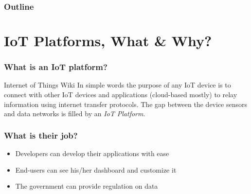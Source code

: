 \documentclass{../iot-lecture}
\subtitle{IoT Platforms}
\begin{document}
\begin{frame}
  \titlepage{}
\end{frame}
\begin{frame}
  \frametitle{Outline}
  \tableofcontents{}
\end{frame}

\section{IoT Platforms, What \& Why?}

\begin{frame}
  \frametitle{What is an IoT platform?}
  \begin{block}{Internet of Things Wiki}
    In simple words the purpose of any IoT device is to connect with
    other IoT devices and applications (cloud-based mostly) to relay
    information using internet transfer protocols.
    The gap between the device sensors and data networks is filled
    by an \textit{\color{Green} IoT Platform}.
  \end{block}
\end{frame}

\begin{frame}
  \frametitle{What is their job?}
  \begin{itemize}
    \item Developers can develop their applications with ease
    \item End-users can see his/her dashboard and customize it
    \item The government can provide regulation on data
  \end{itemize}
\end{frame}
\end{document}
